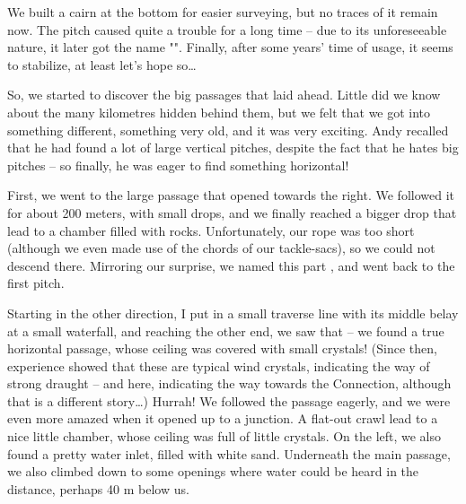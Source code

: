 We built a cairn at the bottom for easier surveying, but no traces of it remain now. The pitch caused quite a trouble for a long time -- due to its unforeseeable nature, it later got the name "". Finally, after some years' time of usage, it seems to stabilize, at least let's hope so\ldots{}


So, we started to discover the big passages that laid ahead. Little did we know about the many kilometres hidden behind them, but we felt that we got into something different, something very old, and it was very exciting. Andy recalled that he had found a lot of large vertical pitches, despite the fact that he hates big pitches -- so finally, he was eager to find something horizontal!

First, we went to the large passage that opened towards the right. We followed it for about 200 meters, with small drops, and we finally reached a bigger drop that lead to a chamber filled with rocks.
Unfortunately, our rope was too short (although we even made use of the chords of our tackle-sacs), so we could not descend there. Mirroring our surprise, we named this part , and went back to the first pitch.



Starting in the other direction, I put in a small traverse line with its middle belay at a small waterfall, and reaching the other end, we saw
that  -- we found a true horizontal passage, whose ceiling was covered with small crystals! (Since then,
experience showed that these are typical wind crystals, indicating the way of strong draught -- and here, indicating the way towards the
Connection, although that is a different story\ldots{}) Hurrah! We followed the passage eagerly, and we were even more amazed when it
opened up to a junction. A flat-out crawl lead to a nice little chamber,
whose ceiling was full of little crystals. On the left, we also found a
pretty water inlet, filled with white sand. Underneath the main passage,
we also climbed down to some openings where water could be heard in the distance, perhaps 40 m below us.


